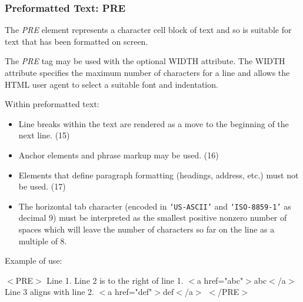 \subsubsection*{Preformatted Text:  PRE}\par 
The {\it PRE} element represents a character cell block of text and
so is suitable for text that has been formatted on screen.
\par \par 
The {\it PRE} tag may be used with the optional WIDTH attribute.  The
WIDTH attribute specifies the maximum number of characters for a line
and allows the HTML user agent to select a suitable font and
indentation.
\par \par 
Within preformatted text:
\par \begin{itemize}\item 
Line breaks within the text are rendered as a move to the
beginning of the next line.
(15)\item 
Anchor elements and phrase markup may be used.
(16)\item 
Elements that define paragraph formatting (headings, address,
etc.) must not be used.
(17)\item 
The horizontal tab character (encoded in {\tt `US-ASCII'} and
{\tt `ISO-8859-1'} as decimal 9) must be interpreted as the smallest
positive nonzero number of spaces which will leave the number of
characters so far on the line as a multiple of 8.
\end{itemize}\par 
Example of use:
\par $<$PRE$>$
Line 1.
       Line 2 is to the right of line 1.     $<$a href="abc"$>$abc$<$/a$>$
       Line 3 aligns with line 2.            $<$a href="def"$>$def$<$/a$>$
$<$/PRE$>$
